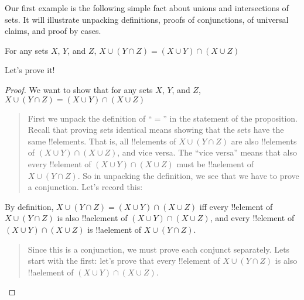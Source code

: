 \documentclass[../../../include/open-logic-section]{subfiles}
\begin{document}


Our first example is the following simple fact about unions and
intersections of sets.  It will illustrate unpacking definitions,
proofs of conjunctions, of universal claims, and proof by cases.

\begin{prop}
For any sets $X$, $Y$, and $Z$, $X \cup (Y \cap Z) = (X \cup Y)
\cap (X \cup Z)$
\end{prop}

Let's prove it!{}

\begin{proof}
We want to show that for any sets $X$, $Y$, and $Z$, $X \cup (Y \cap
Z) = (X \cup Y) \cap (X \cup Z)$
\begin{quote}
First we unpack the definition of ``$=$'' in the statement of the
proposition. Recall that proving sets identical means showing that the
sets have the same !!{element}s. That is, all !!{element}s of $X \cup
(Y \cap Z)$ are also !!{element}s of $(X \cup Y) \cap (X \cup Z)$, and
vice versa.  The ``vice versa'' means that also every !!{element} of $(X
\cup Y) \cap (X \cup Z)$ must be !!a{element} of $X \cup (Y \cap
Z)$.  So in unpacking the definition, we see that we have to prove a
conjunction.  Let's record this:
\end{quote}
By definition, $X \cup (Y \cap Z) = (X \cup Y) \cap (X \cup Z)$ iff
every !!{element} of $X \cup (Y \cap Z)$ is also !!a{element} of $(X
\cup Y) \cap (X \cup Z)$, and every !!{element} of $(X \cup Y) \cap (X
\cup Z)$ is !!a{element} of $X \cup (Y \cap Z)$.
\begin{quote}
Since this is a conjunction, we must prove each conjunct
separately. Lets start with the first: let's prove that every
!!{element} of $X \cup (Y \cap Z)$ is also !!a{element} of $(X
\cup Y) \cap (X \cup Z)$.


\end{quote}
\end{proof}
\end{document}
